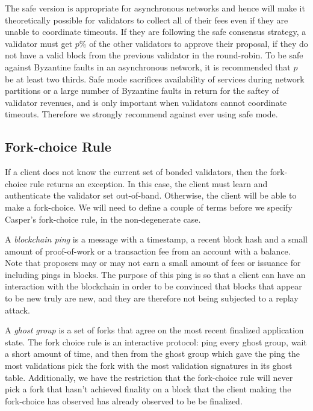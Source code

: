 \documentclass[11pt,a4paper]{article}
\begin{document}
The safe version is appropriate for asynchronous networks and hence will make it theoretically possible for validators to collect all of their fees even if they are unable to coordinate timeouts. If they are following the safe consensus strategy, a validator must get $p\%$ of the other validators to approve their proposal, if they do not have a valid block from the previous validator in the round-robin. To be safe against Byzantine faults in an asynchronous network, it is recommended that $p$ be at least two thirds. Safe mode sacrifices availability of services during network partitions or a large number of Byzantine faults in return for the saftey of validator revenues, and is only important when validators cannot coordinate timeouts. Therefore we strongly recommend against ever using safe mode.


\subsection{Fork-choice Rule}

If a client does not know the current set of bonded validators, then the fork-choice rule returns an exception. In this case, the client must learn and authenticate the validator set out-of-band. Otherwise, the client will be able to make a fork-choice. We will need to define a couple of terms before we specify Casper's fork-choice rule, in the non-degenerate case.

A \emph{blockchain ping} is a message with a timestamp, a recent block hash and a small amount of proof-of-work or a transaction fee from an account with a balance. Note that proposers may or may not earn a small amount of fees or issuance for including pings in blocks. The purpose of this ping is so that a client can have an interaction with the blockchain in order to be convinced that blocks that appear to be new truly are new, and they are therefore not being subjected to a replay attack.

A \emph{ghost group} is a set of forks that agree on the most recent finalized application state. The fork choice rule is an interactive protocol: ping every ghost group, wait a short amount of time, and then from the ghost group which gave the ping the most validations pick the fork with the most validation signatures in its ghost table. Additionally, we have the restriction that the fork-choice rule will never pick a fork that hasn't achieved finality on a block that the client making the fork-choice has observed has already observed to be be finalized. 
\end{document}
